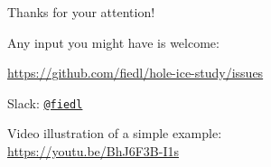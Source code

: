 
\begin{frame}{Thanks for your attention!}
  \begin{center}
    Any input you might have is welcome: \\ \vspace{0.3cm}

    \url{https://github.com/fiedl/hole-ice-study/issues} \\ \vspace{0.1cm}

    Slack: \href{https://icecube-spno.slack.com/messages/@U092MBFU2}{\texttt{@fiedl}}

    \vspace{1.5cm}

    \small{
      Video illustration of a simple example: \\
      \url{https://youtu.be/BhJ6F3B-I1s}
    }

  \end{center}
\end{frame}

